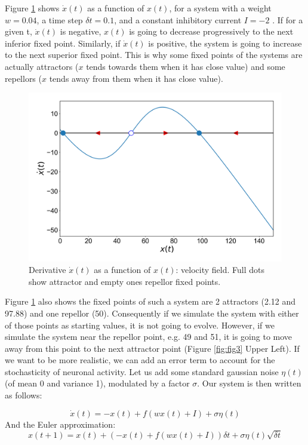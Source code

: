 \documentclass{article}
\begin{document}
Figure \ref{fig:fig2} shows $\dot{x}(t)$ as a function of $x(t)$, for a system with a  weight $w=0.04$, a time step $\delta t = 0.1$, and a constant inhibitory current $I=-2$ . If for a given t,  $\dot{x}(t)$ is negative, $x(t)$ is going to decrease progressively to the next inferior fixed point. Similarly, if $\dot{x}(t)$ is positive, the system is going to increase to the next superior fixed point. This is why some fixed points of the systems are actually attractors ($x$ tends towards them when it has close value) and some repellors ($x$ tends away from them when it has close value).

\begin{figure}[H]
\centering
\includegraphics[width=.8\linewidth]{exercice5fig2.png}
\caption[spt]{Derivative $\dot{x}(t)$ as a function of $x(t)$: velocity field. Full dots show attractor and empty ones repellor fixed points.}\label{fig:fig2}
\end{figure}

Figure \ref{fig:fig2} also shows the fixed points of such a system are 2 attractors (2.12 and 97.88) and one repellor (50). Consequently if we simulate the system with either of those points as starting values, it is not going to evolve. However, if we simulate the system near the repellor point, e.g. 49 and 51, it is going to move away from this point to the next attractor point (Figure \ref{fig:fig3} Upper Left). If we want to be more realistic, we can add an error term to account for the stochasticity of neuronal activity. Let us add some standard gaussian noise $\eta(t)$ (of mean 0 and variance 1), modulated by a factor $\sigma$. Our system is then written as follows:

\begin{equation}\label{eq:3}
  \dot{x}(t) = -x(t) + f(wx(t) +I)+ \sigma\eta(t)
\end{equation}
\indent And the Euler approximation:
\begin{equation}\label{eq:4}
  {x}(t+1) = x(t) + (-x(t) + f(wx(t) +I))\delta t + \sigma \eta(t) \sqrt{\delta t}
\end{equation}
\end{document}
